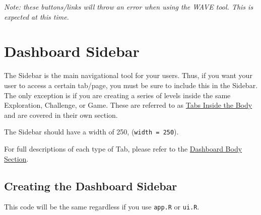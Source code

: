 \documentclass[
]{book}
\begin{document}
\emph{Note: these buttons/links will throw an error when using the WAVE tool. This is expected at this time.}

\hypertarget{sidebar}{%
\section{Dashboard Sidebar}\label{sidebar}}

The Sidebar is the main navigational tool for your users. Thus, if you want your user to access a certain tab/page, you must be sure to include this in the Sidebar. The only exception is if you are creating a series of levels inside the same Exploration, Challenge, or Game. These are referred to as \protect\hyperlink{innerTabs}{Tabs Inside the Body} and are covered in their own section.

The Sidebar should have a width of 250, (\texttt{width\ =\ 250}).

For full descriptions of each type of Tab, please refer to the \protect\hyperlink{body}{Dashboard Body Section}.

\hypertarget{creating-the-dashboard-sidebar}{%
\subsection{Creating the Dashboard Sidebar}\label{creating-the-dashboard-sidebar}}

This code will be the same regardless if you use \texttt{app.R} or \texttt{ui.R}.
\end{document}

